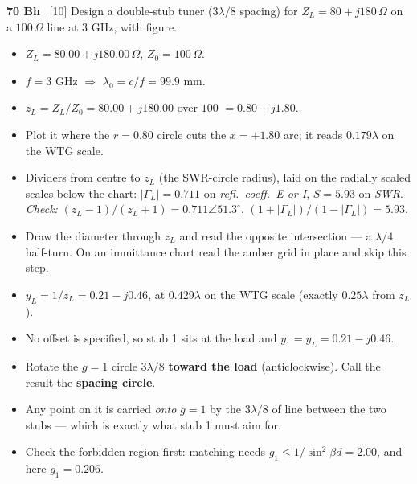 \begin{asked}{\textbf{70 Bh} \ [10]}
Design a double-stub tuner ($3\lambda/8$ spacing) for $Z_L = 80+j180\,\Omega$ on a $100\,\Omega$ line at 3 GHz, with figure.
\end{asked}
\begin{itemize}
  \item $Z_L = 80.00 + j180.00\,\Omega$, $Z_0 = 100\,\Omega$.
  \item $f = 3\text{ GHz}$ $\Rightarrow$ $\lambda_0 = c/f = 99.9\text{ mm}$.
\end{itemize}
\begin{itemize}
  \item $z_L = Z_L/Z_0 = 80.00 + j180.00$ over $100$ $=0.80 + j1.80$.
  \item Plot it where the $r = 0.80$ circle cuts the $x = +1.80$ arc; it reads $0.179\lambda$ on the WTG scale.
  \item Dividers from centre to $z_L$ (the SWR-circle radius), laid on the radially scaled scales below the chart: $|\Gamma_L| = 0.711$ on \emph{refl.\ coeff.\ E or I}, $S = 5.93$ on \emph{SWR}. \textit{Check:} $(z_L-1)/(z_L+1) = 0.711\angle 51.3^\circ$, $(1+|\Gamma_L|)/(1-|\Gamma_L|) = 5.93$.
\end{itemize}
\begin{itemize}
  \item Draw the diameter through $z_L$ and read the opposite intersection --- a $\lambda/4$ half-turn. On an immittance chart read the amber grid in place and skip this step.
  \item $y_L = 1/z_L = 0.21 - j0.46$, at $0.429\lambda$ on the WTG scale (exactly $0.25\lambda$ from $z_L$).
\end{itemize}
\begin{itemize}
  \item No offset is specified, so stub 1 sits at the load and $y_1 = y_L = 0.21 - j0.46$.
\end{itemize}
\begin{itemize}
  \item Rotate the $g=1$ circle $3\lambda/8$ \textbf{toward the load} (anticlockwise). Call the result the \textbf{spacing circle}.
  \item Any point on it is carried \emph{onto} $g=1$ by the $3\lambda/8$ of line between the two stubs --- which is exactly what stub 1 must aim for.
  \item Check the forbidden region first: matching needs $g_1 \le 1/\sin^2\beta d = 2.00$, and here $g_1 = 0.206$. \checkmark
\end{itemize}
